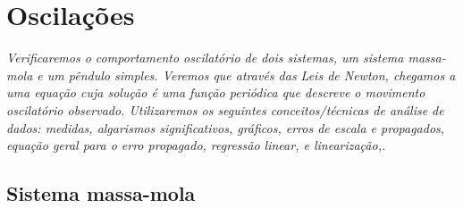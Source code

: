 \chapter{Oscilações}
\label{Chap:ExpOscilacoes}

\begin{fullwidth}\it
	Verificaremos o comportamento oscilatório de dois sistemas, um sistema massa-mola e um pêndulo simples. Veremos que através das Leis de Newton, chegamos a uma equação cuja solução é uma função periódica que descreve o movimento oscilatório observado. Utilizaremos os seguintes conceitos/técnicas de análise de dados: medidas, algarismos significativos, gráficos, erros de escala e propagados, equação geral para o erro propagado, regressão linear, e linearização,.
\end{fullwidth}

\section{Sistema massa-mola}

